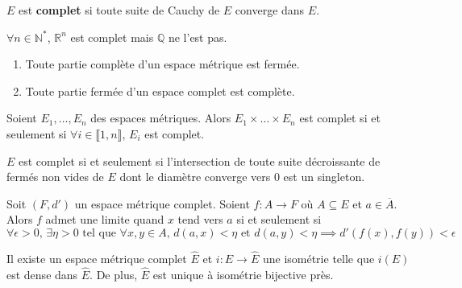   \begin{definition}
    $E$ est \textbf{complet} si toute suite de Cauchy de $E$ converge dans $E$.
  \end{definition}

  \begin{example}
    $\forall n \in \mathbb{N}^*$, $\mathbb{R}^n$ est complet mais $\mathbb{Q}$ ne l'est pas.
  \end{example}

  \begin{proposition}
    \begin{enumerate}[label={\bfseries(\roman*)}]
      \item Toute partie complète d'un espace métrique est fermée.
      \item Toute partie fermée d'un espace complet est complète.
    \end{enumerate}
  \end{proposition}

  \begin{proposition}
    Soient $E_1, \dots, E_n$ des espaces métriques. Alors $E_1 \times \dots \times E_n$ est complet si et seulement si $\forall i \in \llbracket 1, n \rrbracket$, $E_i$ est complet.
  \end{proposition}

  \begin{proposition}
    $E$ est complet si et seulement si l'intersection de toute suite décroissante de fermés non vides de $E$ dont le diamètre converge vers $0$ est un singleton.
  \end{proposition}

  \begin{proposition}
    Soit $(F, d')$ un espace métrique complet. Soient $f : A \rightarrow F$ où $A \subseteq E$ et $a \in \overline{A}$. Alors $f$ admet une limite quand $x$ tend vers $a$ si et seulement si
    \[ \forall \epsilon > 0, \, \exists \eta > 0 \text{ tel que } \forall x, y \in A, \, d(a,x) < \eta \text{ et } d(a,y) < \eta \implies d'(f(x), f(y)) < \epsilon \]
  \end{proposition}


  \begin{theorem}
    Il existe un espace métrique complet $\widehat{E}$ et $i : E \rightarrow \widehat{E}$ une isométrie telle que $i(E)$ est dense dans $\widehat{E}$. De plus, $\widehat{E}$ est unique à isométrie bijective près.
  \end{theorem}

